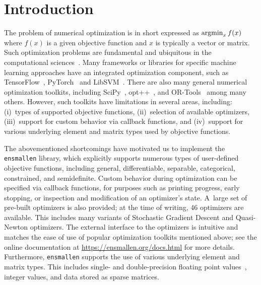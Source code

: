 \documentclass[twoside,11pt]{article}
\begin{document}
\section{Introduction}
\label{sec:introduction}

The problem of numerical optimization is in short expressed as
$\operatornamewithlimits{argmin}_x f(x)$
where $f(x)$ is a given objective function and $x$ is typically a vector or matrix.
Such optimization problems are fundamental and ubiquitous in the computational sciences~\citep{Nocedal_2006}.
Many frameworks or libraries for specific machine learning approaches
have an integrated optimization component,
such as
TensorFlow~\citep{tensorflow2015-whitepaper},
PyTorch~\citep{NEURIPS2019_9015}
and LibSVM~\citep{libsvm2011}.
There are also many general numerical optimization toolkits,
including SciPy~\citep{2019arXiv190710121V},
opt++~\citep{meza1994opt++},
and 
OR-Tools~\citep{ortools} among many others.
However, such toolkits have limitations in several areas,
including:
(i)~types of supported objective functions,
(ii)~selection of available optimizers,
(iii)~support for custom behavior via callback functions,
and
(iv)~support for various underlying element and matrix types used by objective functions.


The abovementioned shortcomings have motivated us to implement the {\tt ensmallen} library,
which explicitly supports numerous types of user-defined objective functions,
including general, differentiable, separable, categorical, constrained, and semidefinite.
Custom behavior during optimization can be specified via {callback} functions,
for purposes such as printing progress, early stopping, or inspection and modification of an optimizer's state.
A~large set of pre-built optimizers is also provided;
at the time of writing, 46 optimizers are available.
This includes many variants of Stochastic Gradient Descent and Quasi-Newton optimizers.
The external interface to the optimizers is intuitive
and matches the ease of use of popular
optimization toolkits mentioned above;
see the online documentation at \mbox{\url{https://ensmallen.org/docs.html}} for more details.
Furthermore, {\tt ensmallen} supports the use of various underlying element and matrix types.
This includes single- and double-precision floating point values~\citep{Goldberg_CSUR_1991}, 
integer values, and data stored as sparse matrices.
\end{document}

